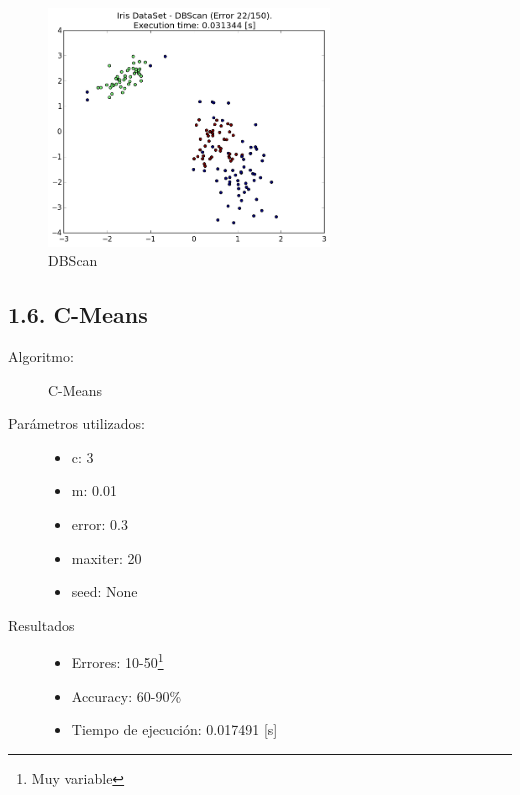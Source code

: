 \documentclass{article}
\begin{document}
\begin{figure}[H]
  \centering
  \includegraphics[width=0.666\textwidth]{img/DBScan.png}
  \caption{DBScan}
\end{figure}

\newpage





\subsection*{1.6. \; C-Means}

\begin{description}
  \item[Algoritmo:] C-Means
  \item[Parámetros utilizados:] \hfill
    \begin{itemize}
      \item c: 3
      \item m: 0.01
      \item error: 0.3
      \item maxiter: 20
      \item seed: None
    \end{itemize}
  \item[Resultados]\hfill
    \begin{itemize}
      \item Errores: 10-50\footnote{Muy variable}
      \item Accuracy:  60-90\%
      \item Tiempo de ejecución: 0.017491 [s]
    \end{itemize}
\end{description}
\end{document}
